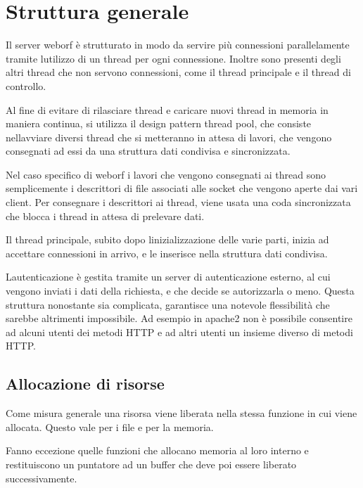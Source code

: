 \documentclass[a4paper,11pt]{article}
\begin{document}
\section{Struttura generale}
{\sffamily
Il server weborf \`e strutturato in modo da servire pi\`u connessioni
parallelamente tramite l{\textquotesingle}utilizzo di un thread per
ogni connessione. Inoltre sono presenti degli altri thread che non
servono connessioni, come il thread principale e il thread di
controllo.}

{\sffamily
Al fine di evitare di rilasciare thread e caricare nuovi thread in
memoria in maniera continua, si utilizza il design pattern thread pool,
che consiste nell{\textquotesingle}avviare diversi thread che si
metteranno in attesa di lavori, che vengono consegnati ad essi da una
struttura dati condivisa e sincronizzata\cite{THP01}.}


\bigskip

{\sffamily
Nel caso specifico di weborf i lavori che vengono consegnati ai thread
sono semplicemente i descrittori di file associati alle socket che
vengono aperte dai vari client. Per consegnare i descrittori ai thread,
viene usata una coda sincronizzata che blocca i thread in attesa di
prelevare dati.}


\bigskip

{\sffamily
Il thread principale, subito dopo l{\textquotesingle}inizializzazione
delle varie parti, inizia ad accettare connessioni in arrivo, e le
inserisce nella struttura dati condivisa.}


\bigskip

{\sffamily
L{\textquotesingle}autenticazione \`e gestita tramite un server di
autenticazione esterno, al cui vengono inviati i dati della richiesta,
e che decide se autorizzarla o meno. Questa struttura nonostante sia
complicata, garantisce una notevole flessibilit\`a che sarebbe
altrimenti impossibile. Ad esempio in apache2 non \`e possibile
consentire ad alcuni utenti dei metodi HTTP e ad altri utenti un
insieme diverso di metodi HTTP.}


\bigskip

\subsection{Allocazione di risorse}
{\sffamily
Come misura generale una risorsa viene liberata nella stessa funzione in
cui viene allocata. Questo vale per i file e per la memoria.}

{\sffamily
Fanno eccezione quelle funzioni che allocano memoria al loro interno e
restituiscono un puntatore ad un buffer che deve poi essere liberato
successivamente.}
\end{document}
